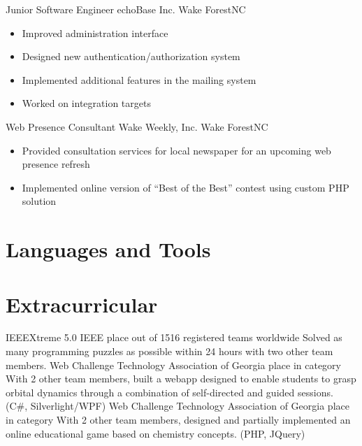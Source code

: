 \documentclass[11pt,letterpaper]{moderncv}
\begin{document}
    {Junior Software Engineer}
    {echoBase Inc.}
    {Wake Forest}{NC}
    {
        \begin{itemize}
            \item Improved administration interface
            \item Designed new authentication/authorization system
            \item Implemented additional features in the mailing system
            \item Worked on integration targets
        \end{itemize}
    }
    {Web Presence Consultant}
    {Wake Weekly, Inc.}
    {Wake Forest}{NC}
    {
        \begin{itemize}
            \item Provided consultation services for local newspaper for an upcoming web presence refresh
            \item Implemented online version of ``Best of the Best'' contest using custom PHP solution
        \end{itemize}
    }

\section{Languages and Tools}

\section{Extracurricular}
    {IEEEXtreme 5.0}
    {IEEE}
    { place out of 1516 registered teams worldwide}
    {}{Solved as many programming puzzles as possible within 24 hours with two other team members.}
    {Web Challenge}
    {Technology Association of Georgia}
    { place in category}
    {}{
        With 2 other team members, built a webapp designed to enable students to grasp orbital dynamics through a combination of self-directed and guided sessions. (C\#, Silverlight/WPF)
    }
    {Web Challenge}
    {Technology Association of Georgia}
    { place in category}
    {}{
        With 2 other team members, designed and partially implemented an online educational game based on chemistry concepts. (PHP, JQuery)
    }
\end{document}
